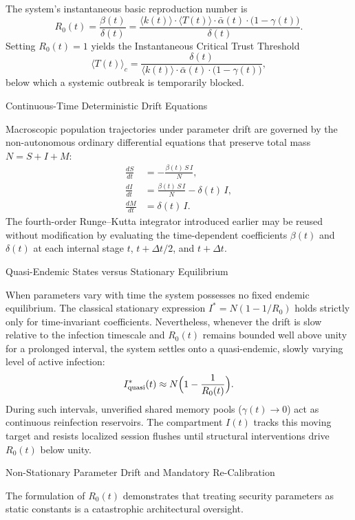 The system’s instantaneous basic reproduction number is
\[
R_0(t) = \frac{\beta(t)}{\delta(t)} = \frac{\langle k(t) \rangle \cdot \langle T(t) \rangle \cdot \bar{\alpha}(t) \cdot \bigl(1 - \gamma(t)\bigr)}{\delta(t)}.
\]
Setting \(R_0(t) = 1\) yields the Instantaneous Critical Trust Threshold
\[
\langle T(t) \rangle_c = \frac{\delta(t)}{\langle k(t) \rangle \cdot \bar{\alpha}(t) \cdot \bigl(1 - \gamma(t)\bigr)},
\]
below which a systemic outbreak is temporarily blocked.

Continuous-Time Deterministic Drift Equations

Macroscopic population trajectories under parameter drift are governed by the non-autonomous ordinary differential equations that preserve total mass \(N = S + I + M\):
\begin{align*}
\frac{dS}{dt} &= -\frac{\beta(t)\,S\,I}{N}, \\
\frac{dI}{dt} &= \frac{\beta(t)\,S\,I}{N} - \delta(t)\,I, \\
\frac{dM}{dt} &= \delta(t)\,I.
\end{align*}
The fourth-order Runge–Kutta integrator introduced earlier may be reused without modification by evaluating the time-dependent coefficients \(\beta(t)\) and \(\delta(t)\) at each internal stage \(t\), \(t+\Delta t/2\), and \(t+\Delta t\).

Quasi-Endemic States versus Stationary Equilibrium

When parameters vary with time the system possesses no fixed endemic equilibrium. The classical stationary expression \(I^* = N(1-1/R_0)\) holds strictly only for time-invariant coefficients. Nevertheless, whenever the drift is slow relative to the infection timescale and \(R_0(t)\) remains bounded well above unity for a prolonged interval, the system settles onto a quasi-endemic, slowly varying level of active infection:
\[
I_{\mathrm{quasi}}^*(t) \approx N\Bigl(1 - \frac{1}{R_0(t)}\Bigr).
\]
During such intervals, unverified shared memory pools (\(\gamma(t)\to 0\)) act as continuous reinfection reservoirs. The compartment \(I(t)\) tracks this moving target and resists localized session flushes until structural interventions drive \(R_0(t)\) below unity.

Non-Stationary Parameter Drift and Mandatory Re-Calibration

The formulation of \(R_0(t)\) demonstrates that treating security parameters as static constants is a catastrophic architectural oversight.

